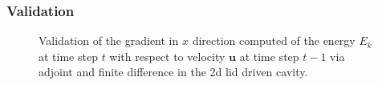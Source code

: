 \begin{frame}
  \frametitle{Validation}
\begin{figure}
  \centering
  \caption{Validation of the gradient in $x$
  direction computed of the energy $E_k$ at time step $t$ with respect to
  velocity $\mathbf{u}$ at time step $t-1$ via adjoint and finite
  difference in the 2d lid driven cavity.}
  \label{fig:fd}
\end{figure}
\end{frame}

